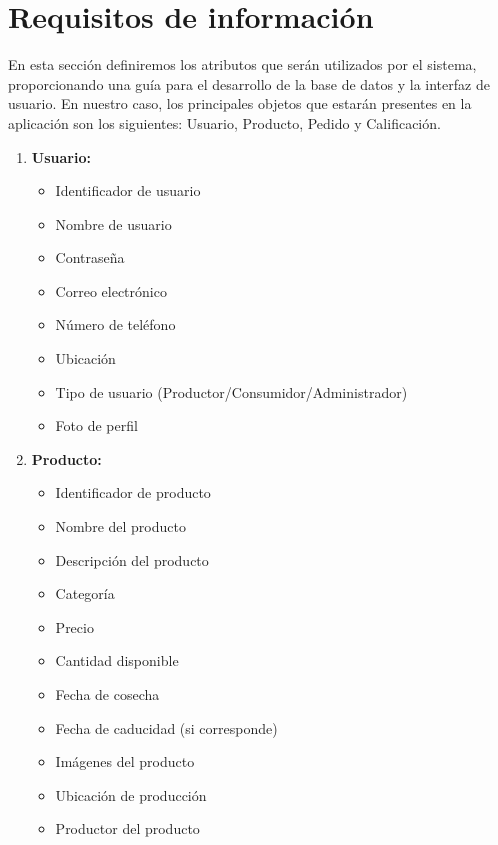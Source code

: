 
\section{Requisitos de información}\label{sec:requisitos-informacion}

En esta sección definiremos los atributos que serán utilizados por el sistema, proporcionando una guía para el desarrollo de la base de datos y la interfaz de usuario. En nuestro caso, los principales objetos que estarán presentes en la aplicación son los siguientes: Usuario, Producto, Pedido y Calificación.

\begin{enumerate}[{IRQ}-1:]
	
	\item \textbf{Usuario:}
	\begin{itemize}
		\item Identificador de usuario
		\item Nombre de usuario
		\item Contraseña
		\item Correo electrónico
		\item Número de teléfono
		\item Ubicación
		\item Tipo de usuario (Productor/Consumidor/Administrador)
		\item Foto de perfil
	\end{itemize}
	
    \item \textbf{Producto:}
    \begin{itemize}
        \item Identificador de producto
        \item Nombre del producto
        \item Descripción del producto
        \item Categoría
        \item Precio
        \item Cantidad disponible
        \item Fecha de cosecha
        \item Fecha de caducidad (si corresponde)
        \item Imágenes del producto
        \item Ubicación de producción
        \item Productor del producto
\end{itemize}


\end{enumerate}

